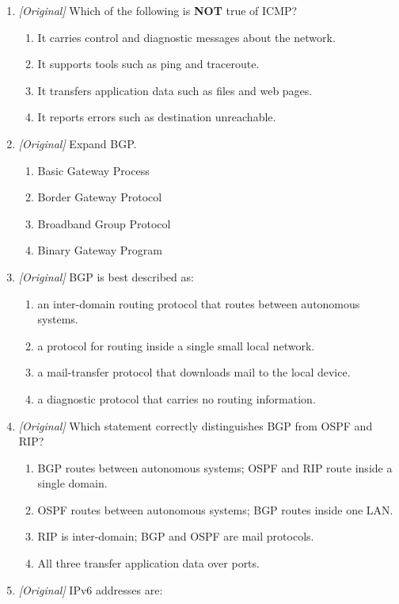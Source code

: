 \begin{enumerate}[label=\textbf{Q\arabic*.}, leftmargin=*]
\item \textit{[Original]} Which of the following is \textbf{NOT} true of ICMP?
  \begin{enumerate}[label=\Alph*.]
    \item It carries control and diagnostic messages about the network.
    \item It supports tools such as ping and traceroute.
    \item It transfers application data such as files and web pages.
    \item It reports errors such as destination unreachable.
  \end{enumerate}
\item \textit{[Original]} Expand BGP.
  \begin{enumerate}[label=\Alph*.]
    \item Basic Gateway Process
    \item Border Gateway Protocol
    \item Broadband Group Protocol
    \item Binary Gateway Program
  \end{enumerate}
\item \textit{[Original]} BGP is best described as:
  \begin{enumerate}[label=\Alph*.]
    \item an inter-domain routing protocol that routes between autonomous
      systems.
    \item a protocol for routing inside a single small local network.
    \item a mail-transfer protocol that downloads mail to the local device.
    \item a diagnostic protocol that carries no routing information.
  \end{enumerate}
\item \textit{[Original]} Which statement correctly distinguishes BGP from
  OSPF and RIP?
  \begin{enumerate}[label=\Alph*.]
    \item BGP routes between autonomous systems; OSPF and RIP route inside a
      single domain.
    \item OSPF routes between autonomous systems; BGP routes inside one LAN.
    \item RIP is inter-domain; BGP and OSPF are mail protocols.
    \item All three transfer application data over ports.
  \end{enumerate}
\item \textit{[Original]} IPv6 addresses are:

\end{enumerate}
